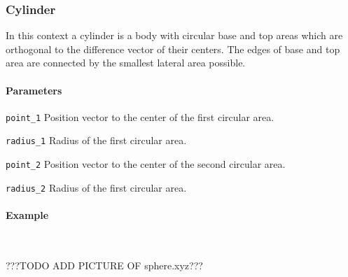 \subsubsection{Cylinder}
In this context a cylinder is a body with circular base and top areas which are orthogonal to the difference vector of their centers. The edges of base and top area are connected by the smallest lateral area possible.

\paragraph{Parameters}
\begin{description}
 \item{\lstinline{point_1}} Position vector to the center of the first circular area.
 \item{\lstinline{radius_1}} Radius of the first circular area.
 \item{\lstinline{point_2}} Position vector to the center of the second circular area.
 \item{\lstinline{radius_2}} Radius of the first circular area.
\end{description}

\paragraph{Example}\ 


???TODO ADD PICTURE OF sphere.xyz???